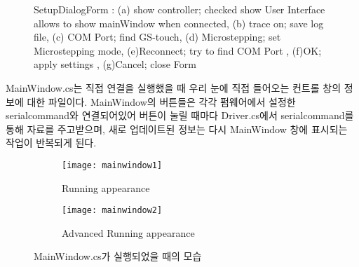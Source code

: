 \begin{figure}[h]
	\begin{center}
	\end{center}
	\caption{SetupDialogForm : (a) show controller; checked show User Interface allows to show mainWindow when connected, (b) trace on; save log file, (c) COM Port; find GS-touch, (d) Microstepping; set Microstepping mode, (e)Reconnect; try to find COM Port , (f)OK; apply settings , (g)Cancel; close Form }
	\label{fig:setupdialogform_capture}	
\end{figure}



MainWindow.cs는 직접 연결을 실행했을 때 우리 눈에 직접 들어오는 컨트롤 창의 정보에 대한 파일이다. MainWindow의 버튼들은 각각 펌웨어에서 설정한 serialcommand와 연결되어있어 버튼이 눌릴 때마다 Driver.cs에서 serialcommand를 통해 자료를 주고받으며, 새로 업데이트된 정보는 다시 MainWindow 창에 표시되는 작업이 반복되게 된다. 

\begin{figure}[h]
	\begin{subfigure}{0.5\textwidth}
		\begin{center}
			\texttt{[image: mainwindow1]} 
		\end{center}	
		\caption{Running appearance}
		\label{fig:mainwindow1}
	\end{subfigure}
	\begin{subfigure}{0.5\textwidth}
		\begin{center}			
			\texttt{[image: mainwindow2]}
		\end{center}
		\caption{Advanced Running appearance}
		\label{fig:mainwindow2}
	\end{subfigure}
	\caption{MainWindow.cs가 실행되었을 때의 모습}
	\label{fig:mainwindow}
\end{figure}

